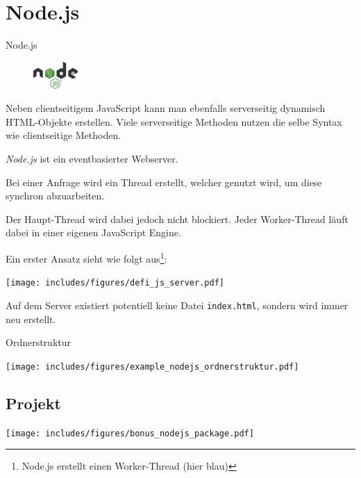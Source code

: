 \section{Node.js}

\begin{defi}{Node.js}
    \begin{figure}
        \centering
        \includegraphics[width=0.15\textwidth]{includes/figures/defi_node_js.png}
    \end{figure}
    Neben clientseitigem JavaScript kann man ebenfalls serverseitig dynamisch HTML-Objekte erstellen.
    Viele serverseitige Methoden nutzen die selbe Syntax wie clientseitige Methoden.

    \emph{Node.js} ist ein eventbasierter Webserver.

    Bei einer Anfrage wird ein Thread erstellt, welcher genutzt wird, um diese synchron abzuarbeiten.

    Der Haupt-Thread wird dabei jedoch nicht blockiert.
    Jeder Worker-Thread läuft dabei in einer eigenen JavaScript Engine.

    Ein erster Ansatz sieht wie folgt aus\footnote{Node.js erstellt einen Worker-Thread (hier blau)}:
    \begin{center}
        \texttt{[image: includes/figures/defi\_js\_server.pdf]}
    \end{center}
    Auf dem Server existiert potentiell keine Datei \texttt{index.html}, sondern wird immer neu erstellt.
\end{defi}

\begin{example}{Ordnerstruktur}
    \begin{center}
        \texttt{[image: includes/figures/example\_nodejs\_ordnerstruktur.pdf]}
    \end{center}
\end{example}

\subsection{Projekt}

\begin{center}
    \texttt{[image: includes/figures/bonus\_nodejs\_package.pdf]}
\end{center}

